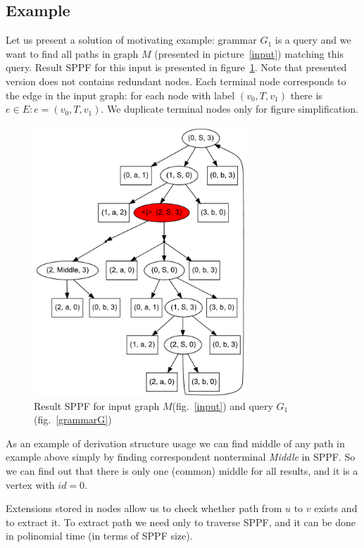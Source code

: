 \subsection{Example}

Let us present a solution of motivating example: grammar $G_1$ is a query and we want to find all paths in graph $M$ (presented in picture~\ref{input}) matching this query.
Result SPPF for this input is presented in figure~\ref{SPPF}. Note that presented version does not contains redundant nodes.
Each terminal node corresponds to the edge in the input graph: for each node with label $(v_0, T, v_1)$ there is $e\in E: e=(v_0,T,v_1)$.
We duplicate terminal nodes only for figure simplification.

\begin{figure}[h]
    \begin{center}
        \includegraphics[width=8cm]{dot/AnBn.pdf}
        \caption{Result SPPF for input graph $M$(fig.~\ref{input}) and query $G_1$(fig.~\ref{grammarG})}
        \label{SPPF}        
    \end{center}
\end{figure}

    
As an example of derivation structure usage we can find middle of any path in example above simply by finding correspondent nonterminal \textit{Middle} in SPPF.
So we can find out that there is only one (common) middle for all results, and it is a vertex with $id = 0$. 

Extensions stored in nodes allow us to check whether path from $u$ to $v$ exists and to extract it. 
To extract path we need only to traverse SPPF, and it can be done in polinomial time (in terms of SPPF size). 

